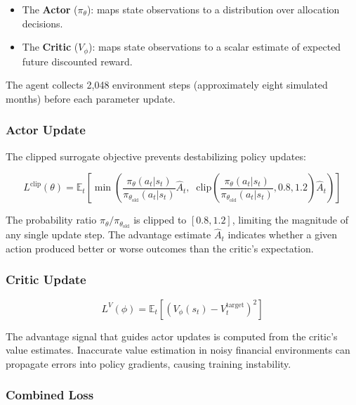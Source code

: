 \documentclass[pdflatex,sn-mathphys-num]{sn-jnl}
\begin{document}
\begin{itemize}[leftmargin=*]
\item The \textbf{Actor} ($\pi_\theta$): maps state observations to a distribution over allocation decisions.
\item The \textbf{Critic} ($V_\phi$): maps state observations to a scalar estimate of expected future discounted reward.
\end{itemize}

The agent collects 2,048 environment steps (approximately eight simulated
months) before each parameter update.

\subsubsection{Actor Update}

The clipped surrogate objective prevents destabilizing policy updates:

\begin{equation}\label{eq:ppo}
    L^{\mathrm{clip}}(\theta) = \mathbb{E}_t \left[ \min\!\left(
    \frac{\pi_\theta(a_t|s_t)}{\pi_{\theta_{\mathrm{old}}}(a_t|s_t)} \hat{A}_t, \;\;
    \mathrm{clip}\!\left(\frac{\pi_\theta(a_t|s_t)}{\pi_{\theta_{\mathrm{old}}}(a_t|s_t)},
    0.8, 1.2\right) \hat{A}_t \right) \right]
\end{equation}

The probability ratio $\pi_\theta / \pi_{\theta_{\mathrm{old}}}$ is clipped
to $[0.8, 1.2]$, limiting the magnitude of any single update step. The
advantage estimate $\hat{A}_t$ indicates whether a given action produced
better or worse outcomes than the critic's expectation.

\subsubsection{Critic Update}

\begin{equation}
    L^{V}(\phi) = \mathbb{E}_t\left[\left(V_\phi(s_t) - V_t^{\mathrm{target}}\right)^2\right]
\end{equation}

The advantage signal that guides actor updates is computed from the critic's
value estimates. Inaccurate value estimation in noisy financial environments
can propagate errors into policy gradients, causing training instability.

\subsubsection{Combined Loss}
\end{document}
